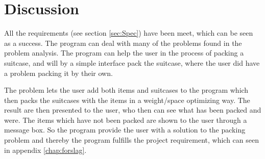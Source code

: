 \section{Discussion}


All the requirements (see section \ref{sec:Spec}) have been meet, which can be seen as a success. The program can deal with many of the problems found in the problem analysis. The program can help the user in the process of packing a suitcase, and will by a simple interface pack the suitcase, where the user did have a problem packing it by their own.



The problem lets the user add both items and suitcases to the program which then packs the suitcases with the items in a weight/space optimizing way. The result are then presented to the user, who then can see what has been packed and were. The items which have not been packed are shown to the user through a message box. So the program provide the user with a solution to the packing problem and thereby the program fulfills the project requirement, which can seen in appendix \ref{chap:forslag}.

